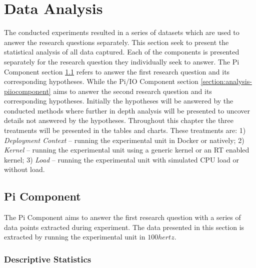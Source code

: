 \iffalse  \fi
\chapter{Data Analysis}

The conducted experiments resulted in a series of datasets which are used to answer the research questions separately. This section seek to present the statistical analysis of all data captured. Each of the components is presented separately for the research question they individually seek to answer. The Pi Component section \ref{section:analysis-picomponent} refers to answer the first research question and its corresponding hypotheses. While the Pi/IO Component section \ref{section:analysis-piiocomponent} aims to answer the second research question and its corresponding hypotheses. Initially the hypotheses will be answered by the conducted methods where further in depth analysis will be presented to uncover details not answered by the hypotheses. Throughout this chapter the three treatments will be presented in the tables and charts. These treatments are: 1) \textit{Deployment Context} – running the experimental unit in Docker or natively; 2) \textit{Kernel} – running the experimental unit using a generic kernel or an RT enabled kernel; 3) \textit{Load} – running the experimental unit with simulated CPU load or without load.


\section{Pi Component}
\label{section:analysis-picomponent}

The Pi Component aims to answer the first research question with a series of data points extracted during experiment. The data presented in this section is extracted by running the experimental unit in $100hertz$.


\subsection{Descriptive Statistics}
\label{section:analysis-picomponent-desc}

